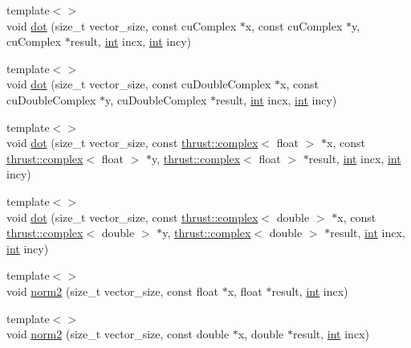 \begin{DoxyCompactItemize}
\item 
{\footnotesize template$<$$>$ }\\void \hyperlink{classcublas__wrap_a5c142873bcb54c6b0f982d2be92b72a9}{dot} (size\-\_\-t vector\-\_\-size, const cu\-Complex $\ast$x, const cu\-Complex $\ast$y, cu\-Complex $\ast$result, \hyperlink{classint}{int} incx, \hyperlink{classint}{int} incy)
\item 
{\footnotesize template$<$$>$ }\\void \hyperlink{classcublas__wrap_ade0f42f801a98ee2a2bd516406f31480}{dot} (size\-\_\-t vector\-\_\-size, const cu\-Double\-Complex $\ast$x, const cu\-Double\-Complex $\ast$y, cu\-Double\-Complex $\ast$result, \hyperlink{classint}{int} incx, \hyperlink{classint}{int} incy)
\item 
{\footnotesize template$<$$>$ }\\void \hyperlink{classcublas__wrap_af4c2784bdb7dff8f729f6d6d8b16e2a8}{dot} (size\-\_\-t vector\-\_\-size, const \hyperlink{test__deflation__typedefs_8h_a25cabcac5deb559feab415e2c445d8ba}{thrust\-::complex}$<$ float $>$ $\ast$x, const \hyperlink{test__deflation__typedefs_8h_a25cabcac5deb559feab415e2c445d8ba}{thrust\-::complex}$<$ float $>$ $\ast$y, \hyperlink{test__deflation__typedefs_8h_a25cabcac5deb559feab415e2c445d8ba}{thrust\-::complex}$<$ float $>$ $\ast$result, \hyperlink{classint}{int} incx, \hyperlink{classint}{int} incy)
\item 
{\footnotesize template$<$$>$ }\\void \hyperlink{classcublas__wrap_a8c8a8ec5cd8300d09cd9f8b00ad43373}{dot} (size\-\_\-t vector\-\_\-size, const \hyperlink{test__deflation__typedefs_8h_a25cabcac5deb559feab415e2c445d8ba}{thrust\-::complex}$<$ double $>$ $\ast$x, const \hyperlink{test__deflation__typedefs_8h_a25cabcac5deb559feab415e2c445d8ba}{thrust\-::complex}$<$ double $>$ $\ast$y, \hyperlink{test__deflation__typedefs_8h_a25cabcac5deb559feab415e2c445d8ba}{thrust\-::complex}$<$ double $>$ $\ast$result, \hyperlink{classint}{int} incx, \hyperlink{classint}{int} incy)
\item 
{\footnotesize template$<$$>$ }\\void \hyperlink{classcublas__wrap_af1bdd4561ae527a8b6236b0b13c448d8}{norm2} (size\-\_\-t vector\-\_\-size, const float $\ast$x, float $\ast$result, \hyperlink{classint}{int} incx)
\item 
{\footnotesize template$<$$>$ }\\void \hyperlink{classcublas__wrap_aa8f8ab7440645617bb649df3eb86dac8}{norm2} (size\-\_\-t vector\-\_\-size, const double $\ast$x, double $\ast$result, \hyperlink{classint}{int} incx)

\end{DoxyCompactItemize}
